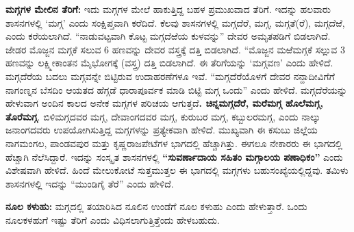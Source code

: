 \textbf{ಮಗ್ಗಗಳ ಮೇಲಿನ ತೆರಿಗೆ:} ಇದು ಮಗ್ಗಗಳ ಮೇಲೆ ಹಾಕುತ್ತಿದ್ದ ಬಹಳ ಪ್ರಮುಖವಾದ ತೆರಿಗೆ. ಇದನ್ನು ಹಲವಾರು ಶಾಸನಗಳಲ್ಲಿ ‘ಮಗ್ಗ’ ಎಂದು ಸಂಕ್ಷಿಪ್ತವಾಗಿ ಕರೆದಿದೆ. ಕೆಲವು ಶಾಸನಗಳಲ್ಲಿ ಮಗ್ಗದೆರೆ,\textbf{ }ಮಗ್ಗ, ಮಗ್ಗತೆ(ರೆ), ಮಗ್ಗದೆಱೆ, ಎಂದು ಕರೆಯಲಾಗಿದೆ. “ನಾಡುವಟ್ಟವಾಗಿ ಕೊಟ್ಟ ಮಗ್ಗದೆಱೆಯ ಕುಳವನ್ನು” ದೇವರ ಅಮೃತಪಡಿಗೆ ಬಿಡಲಾಗಿದೆ. ಜೇಡರ ಮೊಜ್ಜನ ಮಗ್ಗಕೆ ಸಲುವ 6 ಹಣವನ್ನು ದೇವರ ವಸ್ತ್ರಕ್ಕೆ ದತ್ತಿ ಬಿಡಲಾಗಿದೆ. “ಮೊಜ್ಜನ ಮಱೆಮಗ್ಗಕೆ ಸಲ್ಲುವ 3 ಹಣವನ್ನು ಲಕ್ಷ್ಮೀಕಾಂತನ ಮೈಭೋಗಕ್ಕೆ (ವಸ್ತ್ರ) ದತ್ತಿ ಬಿಡಲಾಗಿದೆ. ಈ ತೆರಿಗೆಯನ್ನು ‘ಮಗ್ಗವಣ’ ಎಂದು ಹೇಳಿದೆ. ಮಗ್ಗದೆರೆಯ ಬದಲು ಮಗ್ಗವನ್ನೇ ಬಿಟ್ಟಿರುವ ಉದಾಹರಣೆಗಳೂ ಇವೆ. “ಮಗ್ಗದೆರೆಯೊಳಗೆ ದೇವರ ನನ್ದಾದೀವಿಗೆಗೆ ನಾಗಂಣ್ನನ ಬೆಸದಿಂ ಆಯತದ ಹೆಗ್ಗಡೆ ಧಾರಾಪೂರ್ವಕ ಮಾಡಿ ಬಿಟ್ಟಿ ಮಗ್ಗ ಒಂದು” ಎಂದು ಹೇಳಿದೆ. ಮಗ್ಗದೆರೆಯನ್ನು ಹೇಳುವಾಗ ಅಂದಿನ ಕಾಲದ ಅನೇಕ ಮಗ್ಗಗಳ ಪರಿಚಯ ಆಗುತ್ತದೆ\textbf{. ಚಿನ್ನಮಗ್ಗದೆರೆ, ಮರೆಮಗ್ಗ ಹೊಲೆಮಗ್ಗ, ತೊರೆಮಗ್ಗ}. ಬಿಳಿಮಗ್ಗದವರ ಮಗ್ಗ, ದೇವಾಂಗದವರ ಮಗ್ಗ, ಕುರುಬರ ಮಗ್ಗ, ಕಬ್ಬುಲರಮಗ್ಗ, ಎಂದು ನಾಲ್ಕು ಜನಾಂಗದವರು ಉಪಯೋಗಿಸುತ್ತಿದ್ದ ಮಗ್ಗಗಳನ್ನು ಪ್ರತ್ಯೇಕವಾಗಿ ಹೇಳಿದೆ. ಮುಖ್ಯವಾಗಿ ಈ ಕಸುಬು ಜಿಲ್ಲೆಯ ನಾಗಮಂಗಲ, ಪಾಂಡವಪುರ ಮತ್ತು ಕೃಷ್ಣರಾಜಪೇಟೆಗಳ ಭಾಗದಲ್ಲಿ ಹೆಚ್ಚಾಗಿತ್ತು. ಈಗಲೂ ನೇಕಾರರು ಈ ಭಾಗದಲ್ಲಿ ಹೆಚ್ಚಾಗಿ ನೆಲೆಸಿದ್ದಾರೆ. ಇದನ್ನು ಸಂಸ್ಕೃತ ಶಾಸನಗಳಲ್ಲಿ \textbf{“ಸುವರ್ಣಾದಾಯ ಸಹಿತಂ ಮಗ್ಗಾಲಯ ಪಣಾಧಿಕಂ”} ಎಂದು ವಿಶೇಷವಾಗಿ ಹೇಳಿದೆ. ಹಿಂದೆ ಮೇಲುಕೋಟೆ ಸುತ್ತಮುತ್ತಲ ಈ ಭಾಗದಲ್ಲಿ ಮಗ್ಗಗಳು ಬಹುಸಂಖ್ಯೆಯಲ್ಲಿದ್ದವು. ತಮಿಳು ಶಾಸನಗಳಲ್ಲಿ ಇದನ್ನು “ಮುಂಡಿಗೈ ತೆರೆ” ಎಂದು ಹೇಳಿದೆ.

\textbf{ನೂಲ ಕಳುಹು:} ಮಗ್ಗದಲ್ಲಿ ತಯಾರಿಸಿದ ನೂಲಿನ ಉಂಡೆಗೆ ನೂಲ ಕಳುಹು ಎಂದು ಹೇಳುತ್ತಾರೆ. ಒಂದು ನೂಲಕಳಹುಗೆ ಇಷ್ಟು ತೆರಿಗೆ ಎಂದು ವಿಧಿಸಲಾಗುತ್ತಿತ್ತೆಂದು ಹೇಳಬಹುದು.

